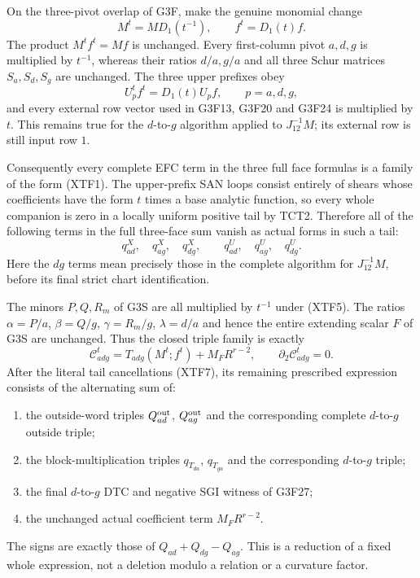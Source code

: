 On the three-pivot overlap of G3F, make the genuine monomial change
\[
                 M^t=M D_1(t^{-1}),\qquad f^t=D_1(t)f.
 \tag{XTF5}
\]
The product $M^t f^t=Mf$ is unchanged.  Every first-column pivot
$a,d,g$ is multiplied by $t^{-1}$, whereas their ratios $d/a,g/a$
and all three Schur matrices $S_a,S_d,S_g$ are unchanged.  The
three upper prefixes obey
\[
                 U_p^t f^t=D_1(t)U_pf,\qquad p=a,d,g,
 \tag{XTF6}
\]
and every external row vector used in G3F13, G3F20 and G3F24 is
multiplied by $t$.  This remains true for the $d$-to-$g$ algorithm
applied to $J_{12}^{-1}M$; its external row is still input row $1$.

Consequently every complete EFC term in the three full face
formulas is a family of the form (XTF1).  The upper-prefix SAN
loops consist entirely of shears whose coefficients have the
form $t$ times a base analytic function, so every whole companion
is zero in a locally uniform positive tail by TCT2.  Therefore all
of the following terms in the full three-face sum vanish as actual
forms in such a tail:
\[
       q^X_{ad},\quad q^X_{ag},\quad q^X_{dg},\qquad
       q^U_{ad},\quad q^U_{ag},\quad q^U_{dg}.
 \tag{XTF7}
\]
Here the $dg$ terms mean precisely those in the complete algorithm
for $J_{12}^{-1}M$, before its final strict chart identification.

The minors $P,Q,R_m$ of G3S are all multiplied by $t^{-1}$ under
(XTF5).  The ratios $\alpha=P/a$, $\beta=Q/g$, $\gamma=R_m/g$,
$\lambda=d/a$ and hence the entire extending scalar $F$ of G3S
are unchanged.  Thus the closed triple family is exactly
\[
    \mathcal C^t_{adg}
      =T_{adg}(M^t;f^t)+M_F R^{r-2},
                   \qquad \partial_2\mathcal C^t_{adg}=0.
 \tag{XTF8}
\]
After the literal tail cancellations (XTF7), its remaining
prescribed expression consists of the alternating sum of:
\begin{enumerate}
\item the outside-word triples $Q^{\rm out}_{ad}$,
      $Q^{\rm out}_{ag}$ and the corresponding complete
      $d$-to-$g$ outside triple;
\item the block-multiplication triples $q_{T_{da}}$,
      $q_{T_{ga}}$ and the corresponding $d$-to-$g$ triple;
\item the final $d$-to-$g$ DTC and negative SGI witness of G3F27;
\item the unchanged actual coefficient term $M_F R^{r-2}$.
\end{enumerate}
The signs are exactly those of $Q_{ad}+Q_{dg}-Q_{ag}$.
This is a reduction of a fixed whole expression, not a deletion
modulo a relation or a curvature factor.

